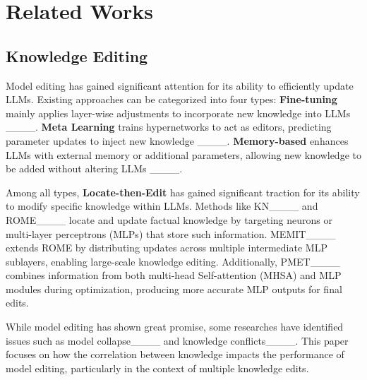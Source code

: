 \section{Related Works}
\label{sec:appendix}

\subsection{Knowledge Editing}
Model editing has gained significant attention for its ability to efficiently update LLMs. Existing approaches can be categorized into four types: \textbf{Fine-tuning} mainly applies layer-wise adjustments to incorporate new knowledge into LLMs ____. \textbf{Meta Learning} trains hypernetworks to act as editors, predicting parameter updates to inject new knowledge ____. \textbf{Memory-based} enhances LLMs with external memory or additional parameters, allowing new knowledge to be added without altering LLMs ____.

Among all types, \textbf{Locate-then-Edit} has gained significant traction for its ability to modify specific knowledge within LLMs. Methods like KN____ and ROME____ locate and update factual knowledge by targeting neurons or multi-layer perceptrons (MLPs) that store such information. MEMIT____ extends ROME by distributing updates across multiple intermediate MLP sublayers, enabling large-scale knowledge editing. Additionally, PMET____ combines information from both multi-head Self-attention (MHSA) and MLP modules during optimization, producing more accurate MLP outputs for final edits.

While model editing has shown great promise, some researches have identified issues such as model collapse____ and knowledge conflicts____. This paper focuses on how the correlation between knowledge impacts the performance of model editing, particularly in the context of multiple knowledge edits.



